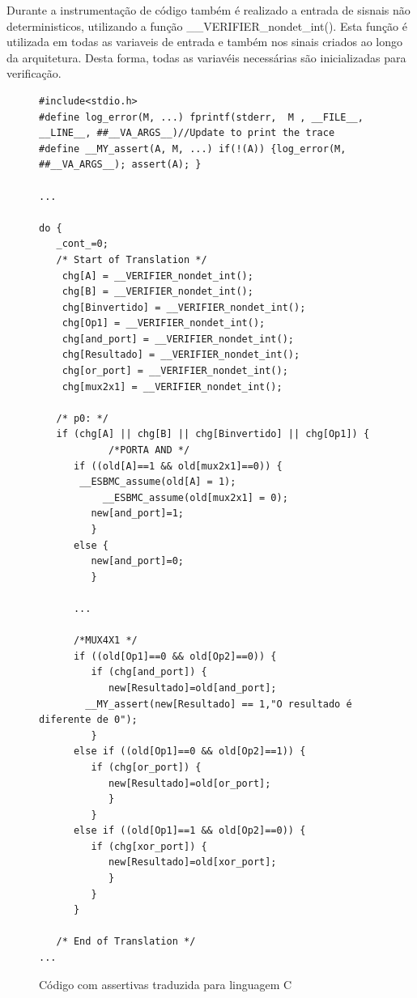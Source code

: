 \par
Durante a instrumentação de código também é realizado a entrada de sisnais não deterministicos, utilizando a função \_\_VERIFIER\_nondet\_int(). Esta função é utilizada em todas as variaveis de entrada e também nos sinais criados ao longo da arquitetura. Desta forma, todas as variavéis necessárias são inicializadas para verificação.
\begin{figure}[H]
\caption{\label{fig:assert_c} Código com assertivas traduzida para linguagem C}
	\begin{center}
    \begin{minipage}{0.99\textwidth}
    \begin{lstlisting}       
#include<stdio.h>
#define log_error(M, ...) fprintf(stderr,  M , __FILE__, __LINE__, ##__VA_ARGS__)//Update to print the trace
#define __MY_assert(A, M, ...) if(!(A)) {log_error(M, ##__VA_ARGS__); assert(A); }

...

do {
   _cont_=0;
   /* Start of Translation */
    chg[A] = __VERIFIER_nondet_int(); 
    chg[B] = __VERIFIER_nondet_int(); 
    chg[Binvertido] = __VERIFIER_nondet_int(); 
    chg[Op1] = __VERIFIER_nondet_int();
    chg[and_port] = __VERIFIER_nondet_int();
    chg[Resultado] = __VERIFIER_nondet_int();
    chg[or_port] = __VERIFIER_nondet_int();
    chg[mux2x1] = __VERIFIER_nondet_int();

   /* p0: */
   if (chg[A] || chg[B] || chg[Binvertido] || chg[Op1]) {
            /*PORTA AND */
      if ((old[A]==1 && old[mux2x1]==0)) {
	   __ESBMC_assume(old[A] = 1);
           __ESBMC_assume(old[mux2x1] = 0);
         new[and_port]=1;
         }
      else {
         new[and_port]=0;
         }

      ...

      /*MUX4X1 */
      if ((old[Op1]==0 && old[Op2]==0)) {
         if (chg[and_port]) {
            new[Resultado]=old[and_port];
	    __MY_assert(new[Resultado] == 1,"O resultado é diferente de 0");
         }
      else if ((old[Op1]==0 && old[Op2]==1)) {
         if (chg[or_port]) {
            new[Resultado]=old[or_port];
            }
         }
      else if ((old[Op1]==1 && old[Op2]==0)) {
         if (chg[xor_port]) {
            new[Resultado]=old[xor_port];
            }
         }
      }

   /* End of Translation */
...
    \end{lstlisting}
    \end{minipage}
	\end{center}
\end{figure}

